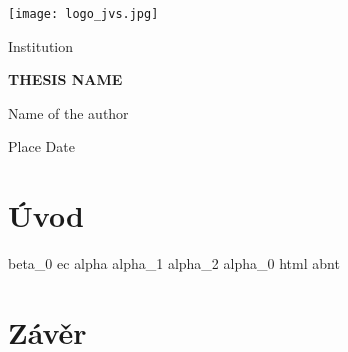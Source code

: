 \documentclass{proc-cz}
\begin{document}
\begin{titlepage}
\begin{center}

\texttt{[image: logo\_jvs.jpg]}

\large
Institution
\vspace{2.8cm}

\Large
\textbf{THESIS NAME}


\vspace{5.5cm}
\Large
Name of the author

\vspace{0.8cm}
Place Date 


\end{center}
\end{titlepage}



%
%


\newpage
\tableofcontents
\newpage
\printunsrtglossary[type=gls_entry]
\newpage


\section{Úvod}

\gls{beta_0}
\gls{ec}
\gls{alpha}
\gls{alpha_1}
\gls{alpha_2}
\gls{alpha_0}
\gls{html}
\gls{abnt}

\newpage

\section{Závěr}

\newpage
\printbibliography[title={Použitá literatura}]
\end{document}
